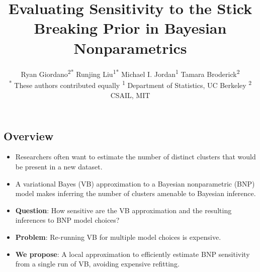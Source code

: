 \documentclass[a0,plainsections,30pt]{sciposter}\usepackage[]{graphicx}\usepackage[]{color}
\title{\textcolor{mydarkblue}{
Evaluating Sensitivity to the Stick Breaking Prior in Bayesian Nonparametrics
}}
\author{Ryan Giordano\textsuperscript{2*} \quad
Runjing Liu\textsuperscript{1*} \quad
Michael I. Jordan\textsuperscript{1} \quad
Tamara Broderick\textsuperscript{2} \\
{\large\normalfont\textsuperscript{*}
These authors contributed equally}\quad
 {\large\normalfont\textsuperscript{1}
 Department of Statistics, UC Berkeley \quad \textsuperscript{2} CSAIL, MIT}
 }
\begin{document}

\setlength{\parskip}{0.25em}

\maketitle

\vspace{-1in}






\begin{minipage}[t]{0.45\textwidth}

\begin{mdframed}[style=MyFrame]
\section*{Overview}
\vspace{-0.3in}
\begin{itemize}
\item Researchers often want to estimate the number of distinct clusters
that would be present in a new dataset.

\item A variational Bayes (VB) approximation to a Bayesian nonparametric (BNP)
model makes inferring the number of clusters amenable to Bayesian inference.

\item \textbf{Question}: How sensitive are the
VB approximation and the resulting inferences to BNP model choices?

\item \textbf{Problem}: Re-running VB for multiple model choices is expensive.

\item \textbf{We propose}: A local approximation to efficiently
estimate BNP sensitivity from a single run of VB, avoiding
expensive refitting.

\end{itemize}
\end{mdframed}
\vspace{-0.7in}


\end{minipage}
\end{document}
